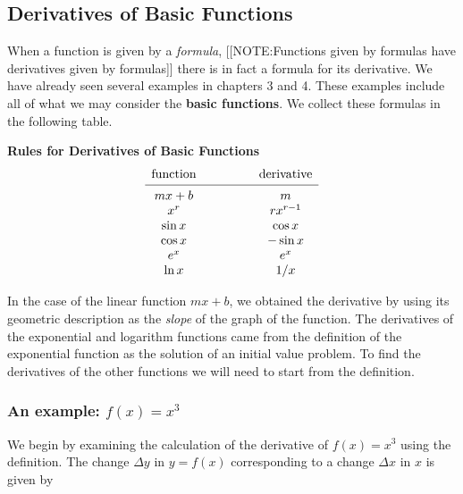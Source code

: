 \subsection{Derivatives of Basic Functions}
\label{subsec:derivatives-of-basic-functions}

      When a function is given by a {\em formula\/},  
      [[NOTE:Functions given by formulas have derivatives given by formulas]]
there is in fact a formula for its derivative. We have already seen several examples in chapters 3 and 4.  These examples include all of what we may consider the {\bf basic functions}.  We collect these formulas in the following table.
\begin{center}

{\bf Rules for Derivatives of Basic Functions}
\[
\begin{array}{cccc}
   \mbox{function}    &\qquad &        &\mbox{derivative} \\[2pt]  
   \hline \\ [-9pt]
        mx+b            & &      &m \\
        x^{r}           & &              &rx^{r-1} \\
        \sin{x}         & &              &\cos{x} \\
        \cos{x}         & &              &-\sin{x}  \\
        e^{x}           & &              &e^{x} \\
        \ln{x}          & &              &1/x \\

\end{array}
\]
\end{center}

In the case of the linear function $mx+b$, we obtained the derivative
by using its geometric description as the {\em slope\/} of the graph
of the function.  The derivatives of the exponential and logarithm
functions came from the definition of the exponential function as the
solution of an initial value problem.  To find the derivatives of the
other functions we will need to start from the definition.

\subsubsection{An example: $f(x)=x^3$} 
\label{subsubsec:an-example-fxx3}

We begin by examining the calculation of the derivative of $f(x) =
x^3$ using the definition. The change $\Delta y$ in $y = f(x)$
corresponding to a change $\Delta x$ in $x$ is given by


